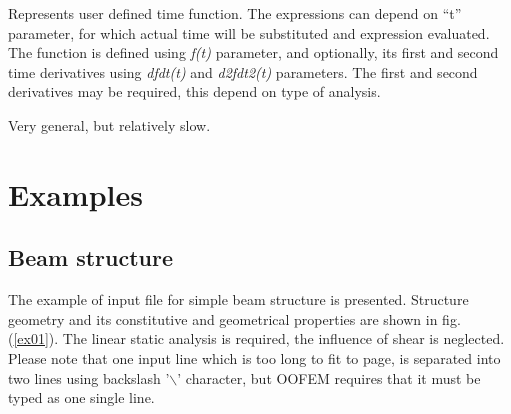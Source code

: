 \documentclass[a4paper]{article}
\newcommand{\param}[1]{{\em #1}}
\begin{document}
\begin{itemize}
  Represents user defined time function. The expressions can depend on
  ``t'' parameter, for which actual time will be substituted and
expression evaluated. The function is defined using \param{f(t)}
  parameter, and optionally, its first and second time derivatives 
  using \param{dfdt(t)} and \param{d2fdt2(t)} parameters. 
The first and second derivatives may be required, this depend on type
  of analysis.

Very general, but relatively slow.
\end{itemize}

\section{Examples}
\subsection {Beam structure}
The example of input file for simple beam structure is presented.
Structure geometry and its constitutive and geometrical properties are
shown in fig. (\ref{ex01}). The linear static analysis is required,
the influence of shear is neglected. Please note that one input line
which is too long to fit to page, is separated into two lines using
backslash '$\backslash$' character, but OOFEM requires that it must be typed as one single line.
\end{document}
